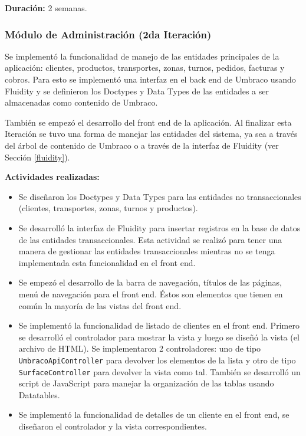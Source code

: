\textbf{Duración:} 2 semanas.

\subsubsection{Módulo de Administración (2da Iteración)}
Se implementó la funcionalidad de manejo de las entidades principales de la aplicación: clientes, productos, transportes, zonas, turnos, pedidos, facturas y cobros. Para esto se implementó una interfaz en el back end de Umbraco usando Fluidity y se definieron los Doctypes y Data Types de las entidades a ser almacenadas como contenido de Umbraco.

También se empezó el desarrollo del front end de la aplicación. Al finalizar esta Iteración se tuvo una forma de manejar las entidades del sistema, ya sea a través del árbol de contenido de Umbraco o a través de la interfaz de Fluidity (ver Sección \ref{fluidity}).

\vspace{0.3cm}
\textbf{Actividades realizadas:}
\begin{itemize}
    \item Se diseñaron los Doctypes y Data Types para las entidades no transaccionales (clientes, transportes, zonas, turnos y productos).
    \item Se desarrolló la interfaz de Fluidity para insertar registros en la base de datos de las entidades transaccionales. Esta actividad se realizó para tener una manera de gestionar las entidades transaccionales mientras no se tenga implementada esta funcionalidad en el front end.
    \item Se empezó el desarrollo de la barra de navegación, títulos de las páginas, menú de navegación para el front end. Éstos son elementos que tienen en común la mayoría de las vistas del front end.
    \item Se implementó la funcionalidad de listado de clientes en el front end. Primero se desarrolló el controlador para mostrar la vista y luego se diseñó la vista (el archivo de HTML). Se implementaron 2 controladores: uno de tipo \texttt{UmbracoApiController} para devolver los elementos de la lista y otro de tipo \texttt{SurfaceController} para devolver la vista como tal. También se desarrolló un script de JavaScript para manejar la organización de las tablas usando Datatables.
    \item Se implementó la funcionalidad de detalles de un cliente en el front end, se diseñaron el controlador y la vista correspondientes.
\end{itemize}

